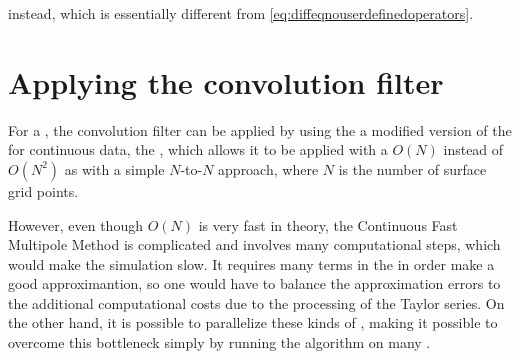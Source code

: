 instead, which is essentially different from \eqref{eq:diffeqnouserdefinedoperators}.

\section{Applying the convolution filter}

For a , the convolution filter can be applied by using the a modified version of the \FMM \citep{Greengard1985,Greengard1987a} for continuous data, the \CFMM \citep{White1994}, which allows it to be applied with a $O(N)$  instead of $O(N^2)$ as with a simple $N$-to-$N$ approach, where $N$ is the number of surface grid points.

However, even though $O(N)$ is very fast in theory, the Continuous Fast Multipole Method is complicated and involves many computational steps, which would make the simulation slow. It requires many terms in the  in order make a good approximantion, so one would have to balance the approximation errors to the additional computational costs due to the processing of the Taylor series. On the other hand, it is possible to parallelize these kinds of  \citep[see e.g.][]{Board1994}, making it possible to overcome this bottleneck simply by running the algorithm on many .
